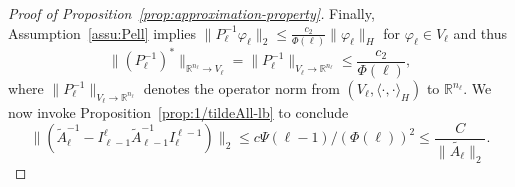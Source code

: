 \documentclass[11pt,english]{article}
\theoremstyle{plain}
\theoremstyle{plain}
\theoremstyle{plain}
\theoremstyle{plain}
\numberwithin{equation}{section}
\begin{document}
\begin{proof}[Proof of Proposition~\ref{prop:approximation-property}]
	Finally, Assumption~\ref{assu:Pell} implies $\|P_{\ell}^{-1}\varphi_{\ell}\|_{2}\leq\frac{c_{2}}{\Phi(\ell)}\|\varphi_{\ell}\|_{H}$
	for $\varphi_{\ell}\in V_{\ell}$ and thus
	\[
		\|(P_{\ell}^{-1})^{*}\|_{\mathbb{R}^{n_{\ell}}\to V_{\ell}}=\|P_{\ell}^{-1}\|_{V_{\ell}\to\mathbb{R}^{n_{\ell}}}\leq\frac{c_{2}}{\Phi(\ell)},
	\]
	where $\|P_{\ell}^{-1}\|_{V_{\ell}\to\mathbb{R}^{n_{\ell}}}$ denotes
	the operator norm from $(V_{\ell},\langle\cdot,\cdot\rangle_{H})$
	to $\mathbb{R}^{n_{\ell}}$. We now invoke Proposition~\ref{prop:1/tildeAll-lb}
	to conclude
	\[
		\|(\widetilde{A}_{\ell}^{-1}-I_{\ell-1}^{\ell}\widetilde{A}_{\ell-1}^{-1}I_{\ell}^{\ell-1})\|_{2}\leq c\Psi(\ell-1)/(\Phi(\ell))^{2}\leq\frac{C}{\|\widetilde{A_{\ell}}\|_{2}}.
	\]
\end{proof}
\end{document}
